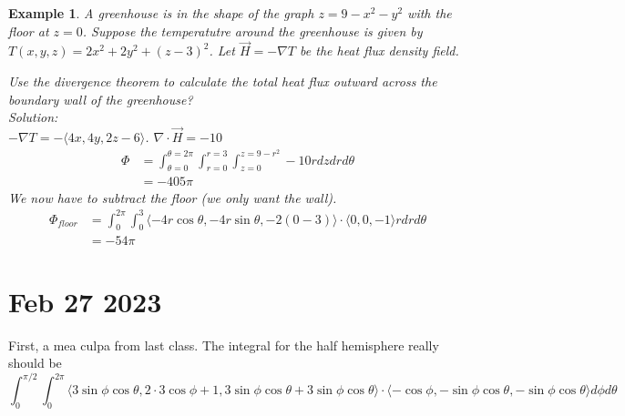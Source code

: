 \documentclass[11pt]{article}
\newtheorem{ex}{Example}
\begin{document}
      \begin{ex}
        A greenhouse is in the shape of the graph $z=9-x^{2}-y^{2}$ with the floor at $z=0$. Suppose the temperatutre around
        the greenhouse is given by $T(x,y,z) = 2x^{2}+2y^{2} + (z-3)^{2}$. Let $\vec{H} = -\nabla T$ be the heat flux density
        field.

        Use the divergence theorem to calculate the total heat flux outward across the boundary wall of the greenhouse? \\

        Solution: \\
        $-\nabla T = -\langle 4x, 4y, 2z-6 \rangle $. $\nabla \cdot \vec{H}  = -10$
        \begin{align*}
          \Phi
          &= \int_{\theta= 0}^{\theta = 2\pi}\int_{r=0}^{r=3}\int_{z=0}^{z=9-r^{2}} -10 r dz dr d\theta \\
          &= -405\pi
        \end{align*}
        We now have to subtract the floor (we only want the wall).
        \begin{align*}
          \Phi_{floor}
          &= \int_{0}^{2\pi}\int_{0}^{3} \langle -4r\cos\theta, -4r\sin\theta, -2(0-3) \rangle \cdot \langle 0, 0, -1 \rangle r dr d\theta\\
          &= -54\pi
        \end{align*}
      \end{ex}
      \section{Feb 27 2023}
      First, a mea culpa from last class. The integral for the half hemisphere really should be
      \[\int_{0}^{\pi/2}\int_{0}^{2\pi} \langle 3\sin\phi\cos\theta, 2 \cdot 3 \cos\phi + 1, 3\sin\phi\cos\theta + 3\sin\phi\cos\theta \rangle \cdot \langle -\cos\phi, -\sin\phi\cos\theta, -\sin\phi\cos\theta \rangle d\phi d\theta\]
\end{document}
